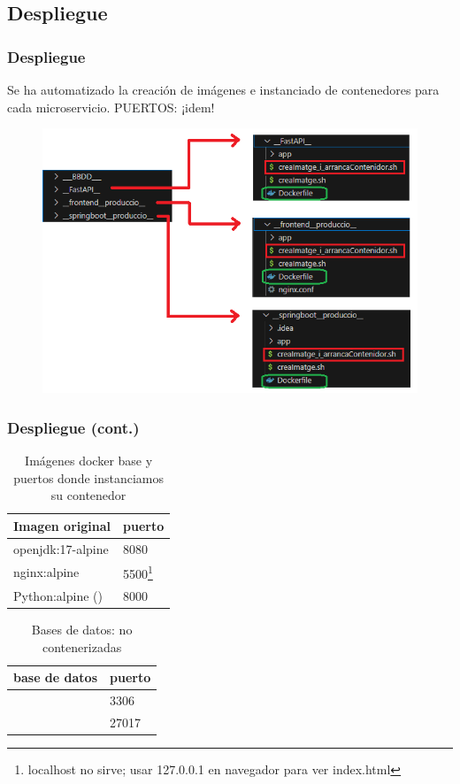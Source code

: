 \documentclass{beamer}
\begin{document}
	\subsection{Despliegue}
	\begin{frame}
		\frametitle{Despliegue}
		Se ha automatizado la creación de imágenes e instanciado de contenedores para cada microservicio. PUERTOS: ¡idem!
		
		\begin{figure}
			\centering
			\includegraphics[width=.7\linewidth]{../img/dockeritzacioAplicacioPlantilla}
			\label{fig:dockeritzacioaplicacioplantilla}
		\end{figure}
	\end{frame}
	
	
	\begin{frame}
		\frametitle{Despliegue (cont.)}
		
		
		\begin{table}[h!]
			\centering
			\begin{tabular}{|l|l|}
				\hline
				\textbf{Imagen original} & \textbf{puerto} \\
				\hline
				
				openjdk:17-alpine & 8080 \\
				nginx:alpine & 5500\footnote{localhost no sirve; usar 127.0.0.1 en navegador para ver index.html} \\
				Python:alpine (\href{https://shorturl.at/YdNuy}{\color{blue}{DF}}) & 8000 \\
		
				\hline
			\end{tabular}
			\caption{Imágenes docker base y puertos donde instanciamos su contenedor}
		\end{table}		
	
	
		\begin{table}[h!]
		\centering
			\begin{tabular}{|l|l|}
				\hline
				\textbf{base de datos} & \textbf{puerto} \\
				\hline
				
				\color{red}{MySQL} & 3306 \\
				\color{red}{MongoDB} & 27017 \\
		
				\hline
			\end{tabular}
			\caption{Bases de datos: no contenerizadas}
		\end{table}		
	\end{frame}
	
\end{document}
